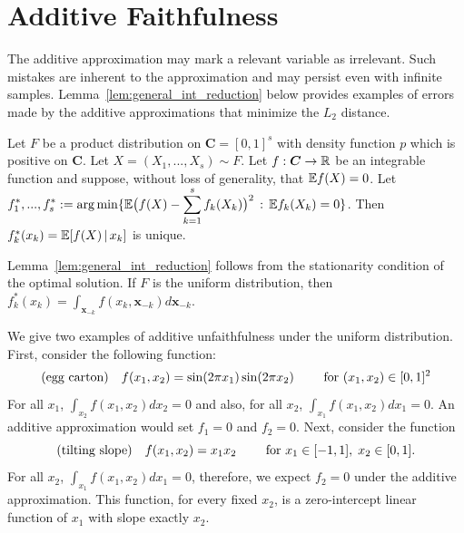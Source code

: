 
\section{Additive Faithfulness}

The additive approximation may mark a relevant variable as
irrelevant. Such mistakes are inherent to the approximation and may
persist even with infinite
samples.  Lemma~\ref{lem:general_int_reduction} below provides
examples of errors made by the additive approximations that minimize
the $L_2$ distance.


\begin{lemma}
\label{lem:general_int_reduction}
Let $F$ be a product distribution on $\mathbf{C}=[0,1]^s$ with density function $p$ which is positive on $\mathbf{C}$. Let
$X=(X_1,...,X_s) \sim F$. Let $f: \mbox{\boldmath $C$} \rightarrow \mathbb{R}$ be an
integrable function and suppose, without loss of generality, that ${\mathbb E} f(X) = 0$.
Let $\displaystyle f^*_1,...,f^*_s := \arg\min \{ {\mathbb E} \bigl( f(X) -
\sum_{k=1}^s f_k(X_k) \bigr)^2 \,:\, {\mathbb E} f_k(X_k) = 0\}$. Then $f^*_k(x_k) = {\mathbb E}[ f(X) {\,|\,} x_k]$ is unique.
\end{lemma}

Lemma~\ref{lem:general_int_reduction} follows from the stationarity
condition of the optimal solution. If $F$ is the uniform distribution,
then $f^*_k(x_k) = \int_{\mathbf{x}_{-k}} f(x_k, \mathbf{x}_{-k})
d\mathbf{x}_{-k}$.

\begin{example} We give two examples of additive unfaithfulness under
  the uniform distribution. First, consider the following function:
\[
\textrm{(egg carton)} \quad f(x_1, x_2) = \sin( 2\pi x_1) \sin( 2 \pi x_2) \qquad \textrm{ for } (x_1, x_2) \in [0,1]^2
\]
For all $x_1$, $\int_{x_2} f(x_1, x_2) d x_2 = 0$ and also, for all
$x_2$, $\int_{x_1} f(x_1, x_2) d x_1 = 0$. An additive approximation
would set $f_1 = 0$ and $f_2 = 0$.  Next, consider the function
\[
\textrm{(tilting slope)} \quad f(x_1, x_2) = x_1 x_2 \qquad \textrm{ for } x_1 \in [-1,1],\; x_2 \in [0,1].
\]
For all $x_2$, $\int_{x_1} f(x_1, x_2) d x_1 = 0$, therefore, we expect $f_2 = 0$ under the additive approximation. This function, for every fixed $x_2$, is a zero-intercept linear function of $x_1$ with slope exactly $x_2$.
\end{example}

